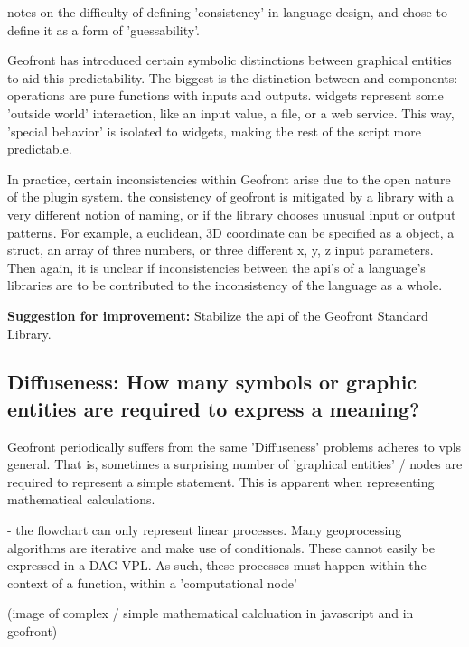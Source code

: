 \cite[]{green_usability_1996} notes on the difficulty of defining 'consistency' in language design, and chose to define it as a form of 'guessability'.

Geofront has introduced certain symbolic distinctions between graphical entities to aid this predictability. 
The biggest is the distinction between  and  components: 
operations are pure functions with inputs and outputs. 
widgets represent some 'outside world' interaction, like an input value, a file, or a web service. 
This way, 'special behavior' is isolated to widgets, making the rest of the script more predictable. 

In practice, certain inconsistencies within Geofront arise due to the open nature of the plugin system. 
the consistency of geofront is mitigated by a library with a very different notion of naming, or if the library chooses unusual input or output patterns. 
For example, a euclidean, 3D coordinate can be specified as a  object, a struct, an array of three numbers, or three different x, y, z input parameters.
Then again, it is unclear if inconsistencies between the api's of a language's libraries are to be contributed to the inconsistency of the language as a whole. 

\textbf{Suggestion for improvement:} Stabilize the api of the Geofront Standard Library.



\subsection*{Diffuseness: How many symbols or graphic entities are required to express a meaning?}

Geofront periodically suffers from the same 'Diffuseness' problems \cite[]{green_usability_1996} adheres to vpls general. 
That is, sometimes a surprising number of 'graphical entities' / nodes are required to represent a simple statement.  
This is apparent when representing mathematical calculations. 

\begin{note}
  - the flowchart can only represent linear processes. Many geoprocessing algorithms are iterative and make use of conditionals. These cannot easily be expressed in a DAG VPL. As such, these processes must happen within the context of a function, within a 'computational node'  
\end{note}


(image of complex / simple mathematical calcluation in javascript and in geofront)

